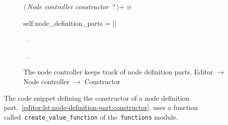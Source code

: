 \documentclass[%
    a4paper,    %
    justified,  %
    nobib,      %
    openany     %
]{tufte-book}
\begin{document}
\begin{figure}
\begin{flushleft} \small
\begin{minipage}{\linewidth}\label{scrap111}\raggedright\small
{} $\langle\,${\itshape Node controller constructor}\nobreak\ {\footnotesize {?}}$\,\rangle+\equiv$
\vspace{-1ex}
\begin{pythoncode}
    self.node_definition_parts = {}
|\NWsep|
\end{pythoncode}
\vspace{1.5ex}
\footnotesize
\begin{list}{}{\setlength{\itemsep}{-\parsep}\setlength{\itemindent}{-\leftmargin}}
\item \NWtxtMacroDefBy\ .
\item \NWtxtMacroRefIn\ .

\item{}
\end{list}
\end{minipage}\vspace{4ex}
\end{flushleft}
\caption{The node controller keeps track of node definition parts.
  \newline{}\newline{}Editor $\rightarrow$ Node controller $\rightarrow$
  Constructor}
\label{editor:lst:node-controller:constructor:node-definition-parts}
\end{figure}

The code snippet defining the constructor of a node definition
part,~\autoref{editor:lst:node-definition-part:constructor}, uses a function
called~\verb=create_value_function= of the~\verb=functions= module.
\end{document}
